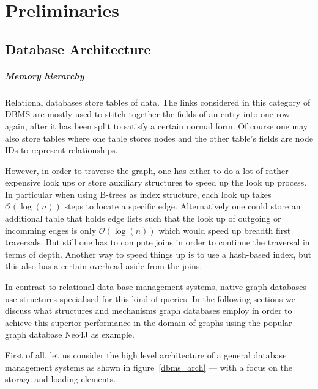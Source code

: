 \chapter{Preliminaries}\label{\positionnumber}

\section{Database Architecture}\label{\positionnumber}
            \paragraph{Memory hierarchy}
        Relational databases store tables of data.
        The links considered in this category of DBMS are mostly used to stitch together the fields of an entry into one row again, after it has been split to satisfy a certain normal form.
        Of course one may also store tables where one table stores nodes and the other table's fields are node IDs to represent relationships.

        However, in order to traverse the graph, one has either to do a lot of rather expensive look ups or store auxiliary structures to speed up the look up process.
        In particular when using B-trees as index structure, each look up takes $\mathcal{O}(\log(n))$ steps to locate a specific edge.
        Alternatively one could store an additional table that holds edge lists such that the look up of outgoing or incomming edges is only $\mathcal{O}(\log(n))$ which would speed up breadth first traversals.
        But still one has to compute joins in order to continue the traversal in terms of depth.
        Another way to speed things up is to use a hash-based index, but this also has a certain overhead aside from the joins.

        In contrast to relational data base management systems, native graph databases use structures specialised for this kind of queries.
        In the following sections we discuss what structures and mechanisms graph databases employ in order to achieve this superior performance in the domain of graphs using the popular graph database Neo4J as example.

        First of all, let us consider the high level architecture of a general database management systems as shown in figure~\ref{dbms_arch} --- with a focus on the storage and loading elements.

